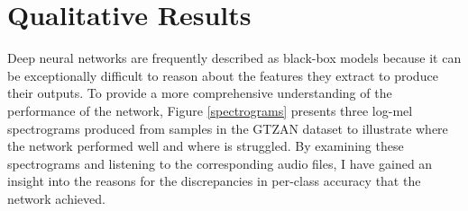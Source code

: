 \documentclass[conference]{IEEEtran}
\begin{document}
\section{Qualitative Results}

Deep neural networks are frequently described as black-box models because it can be exceptionally difficult to reason about the features they extract to produce their outputs.
To provide a more comprehensive understanding of the performance of the network, Figure \ref{spectrograms} presents three log-mel spectrograms produced from samples in the GTZAN dataset to illustrate where the network performed well and where is struggled.
By examining these spectrograms and listening to the corresponding audio files, I have gained an insight into the reasons for the discrepancies in per-class accuracy that the network achieved.
\end{document}
